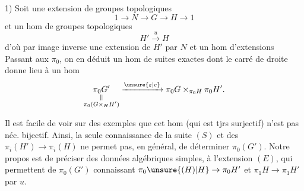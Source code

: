 1) Soit une extension de groupes topologiques
\[
1\to N\to G\to H\to1 \tag*{(E)}
\]
et un hom de groupes topologiques
\[
 H'\xrightarrow{u}H
\]
d'où par image inverse une extension  de $H'$ par $N$ et un hom d'extensions
Passant aux $\pi_0$, on en déduit un hom de suites exactes 
dont le carré de droite donne lieu à un hom
\[
\underset{\substack{\Vert\\\pi_0(G\times_H H')}}{\pi_0G'}\xrightarrow{\unsure{\varepsilon|c}}
\pi_0G\times_{\pi_0H}\pi_0H'.
\]

Il est facile de voir sur des exemples que cet hom (qui est tjrs surjectif) n'est pas néc. bijectif. Ainsi, la seule connaissance de  la suite $(S)$ et des $\pi_i(H')\to\pi_i(H)$ ne permet pas, en général, de  déterminer $\pi_0(G')$. Notre propos est de préciser des données algébriques simples,  à l'extension $(E)$, qui permettent de    $\pi_0(G')$ connaissant $\pi_0\unsure{(H)|H}\to\pi_0H'$ et $\pi_1H\to\pi_1H'$  par $u$.
